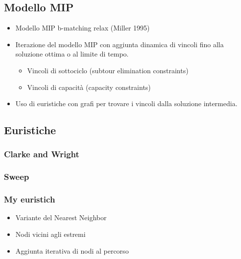 \documentclass[compress]{beamer}
\begin{document}
\subsection{Modello MIP}
\begin{frame}{\subsecname}
    \begin{itemize}
        \item Modello MIP b-matching relax (Miller 1995)
        \item Iterazione del modello MIP con aggiunta dinamica di vincoli fino alla soluzione ottima o al limite di tempo.
        \begin{itemize}
            \item Vincoli di sottociclo (subtour elimination constraints) 
            \item Vincoli di capacità (capacity constraints)
        \end{itemize}
        \item Uso di euristiche con grafi per trovare i vincoli dalla soluzione intermedia.
    \end{itemize}
\end{frame}

\subsection{Euristiche}

\subsubsection{Clarke and Wright}

\begin{frame}{\subsubsecname}
\end{frame}

\subsubsection{Sweep}

\begin{frame}{\subsubsecname}
\end{frame}

\subsubsection{My euristich}
\begin{frame}{\subsubsecname}
    \begin{itemize}
        \item Variante del Nearest Neighbor
        \item Nodi vicini agli estremi
        \item Aggiunta iterativa di nodi al percorso
    \end{itemize}
\end{frame}
\end{document}
